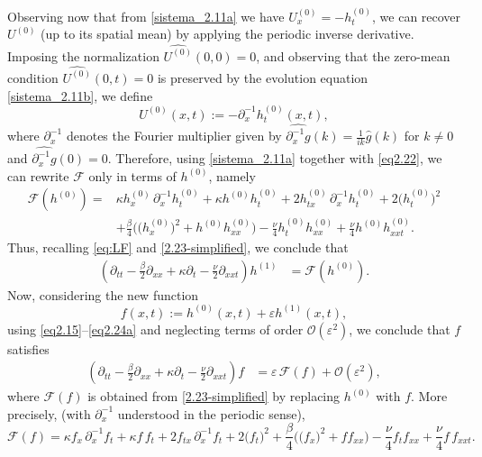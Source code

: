 \documentclass[reqno]{amsart}
\theoremstyle{definition}
\numberwithin{equation}{section}
\numberwithin{theorem}{section}
\numberwithin{definition}{section}
\begin{document}
Observing now that from \eqref{sistema_2.11a} we have $U_x^{(0)}=-h_t^{(0)}$, we can recover $U^{(0)}$
(up to its spatial mean) by applying the periodic inverse derivative. Imposing the normalization $\widehat{U^{(0)}}(0,0)=0$, and observing that the zero-mean condition $\widehat{U^{(0)}}(0,t)=0$ is preserved by the evolution equation \eqref{sistema_2.11b}, we define
\begin{equation}\label{eq2.22}
	U^{(0)}(x,t):=-\partial_x^{-1}h_t^{(0)}(x,t),
\end{equation}
where $\partial_x^{-1}$ denotes the Fourier multiplier given by
$\widehat{\partial_x^{-1}g}(k)=\frac{1}{ik}\widehat g(k)$ for $k\neq 0$ and $\widehat{\partial_x^{-1}g}(0)=0$. Therefore, using  \eqref{sistema_2.11a} together with \eqref{eq2.22}, we can rewrite $\mathcal{F}$ only in terms of $h^{(0)}$, namely
\begin{equation}\label{2.23-simplified}
\begin{aligned}
\mathcal{F}(h^{(0)})=
&\kappa h_x^{(0)}\,\partial_x^{-1}h_t^{(0)}
+\kappa h^{(0)} h_t^{(0)}
+2h_{tx}^{(0)}\,\partial_x^{-1}h_t^{(0)}
+2\big(h_t^{(0)}\big)^2\\
&+\frac{\beta}{4}\Big(\big(h_x^{(0)}\big)^2+h^{(0)}h_{xx}^{(0)}\Big)
-\frac{\nu}{4}h_t^{(0)}h_{xx}^{(0)}
+\frac{\nu}{4}h^{(0)}h_{xxt}^{(0)}.
\end{aligned}
\end{equation}
Thus, recalling \eqref{eq:LF} and \eqref{2.23-simplified}, we conclude that
	\begin{align}
		\left(\partial_{tt} - \frac{\beta}{2}\partial_{xx} + \kappa\partial_t-\frac{\nu}{2}\partial_{xxt}\right)h^{(1)}
		&=\mathcal{F}(h^{(0)}). \label{eq2.24a}
	\end{align}
Now, considering the new function
\[
f(x,t):=h^{(0)}(x,t) + \varepsilon h^{(1)}(x,t),
\]
using \eqref{eq2.15}--\eqref{eq2.24a} and neglecting terms of order $\mathcal{O}(\varepsilon^{2})$, we conclude that
$f$ satisfies
\begin{align}\label{eq2.29}
	\left(\partial_{tt} - \frac{\beta}{2}\partial_{xx} + \kappa\partial_t-\frac{\nu}{2}\partial_{xxt}\right)f
	&=\varepsilon\,\mathcal{F}(f)+\mathcal{O}(\varepsilon^2),
\end{align}
where $\mathcal{F}(f)$ is obtained from \eqref{2.23-simplified} by replacing $h^{(0)}$ with $f$. More precisely,
(with $\partial_x^{-1}$ understood in the periodic sense),
\begin{equation}\label{eq:Ff-simplified}
\mathcal{F}(f)=
\kappa f_x\,\partial_x^{-1}f_t
+\kappa f\, f_t
+2f_{tx}\,\partial_x^{-1}f_t
+2\big(f_t\big)^2
+\frac{\beta}{4}\Big(\big(f_x\big)^2+f f_{xx}\Big)
-\frac{\nu}{4}f_t f_{xx}
+\frac{\nu}{4}f\, f_{xxt}.
\end{equation}
\end{document}
